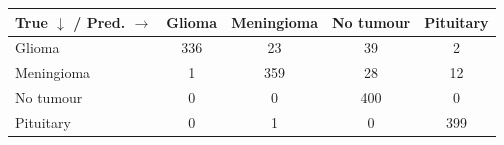 \begin{tabular}{lcccc}
\toprule
True $\downarrow$ / Pred. $\rightarrow$ & Glioma & Meningioma & No tumour & Pituitary \\
\midrule
Glioma & 336 & 23 & 39 & 2 \\
Meningioma & 1 & 359 & 28 & 12 \\
No tumour & 0 & 0 & 400 & 0 \\
Pituitary & 0 & 1 & 0 & 399 \\
\bottomrule
\end{tabular}
